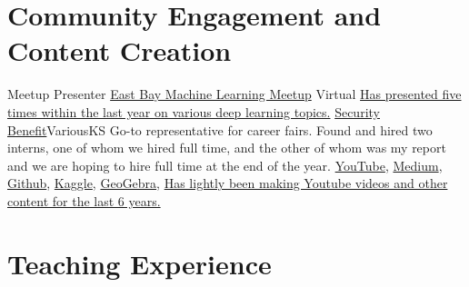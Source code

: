 \documentclass[11pt,a4paper,sans]{moderncv}
\begin{document}
\makecvtitle

\section{Community Engagement and Content Creation}
    {Meetup Presenter}
    {\href{https://www.meetup.com/east-bay-tri-valley-machine-learning-meetup/}{East Bay Machine Learning Meetup}}
    {Virtual}{}
    {\href{https://www.youtube.com/playlist?list=PLytZkHFJwKUf-P1Q_AD-hvYKyH0VREKWw}
        {Has presented five times within the last year on various deep learning topics.}}
    {\href{https://www.securitybenefit.com/splash-page}{Security Benefit}}{Various}{KS}
    {Go-to representative for career fairs.
    Found and hired two interns, one of whom we hired full time,
    and the other of whom was my report and we are hoping to hire full time at the end of the year.}
    {\href{https://www.youtube.com/@grantsmith3653/featured}{YouTube},
    \href{https://medium.com/@14.gsmith.14}{Medium},
    \href{https://github.com/GSmithApps}{Github},
    \href{https://www.kaggle.com/grannysmithapples}{Kaggle},
    \href{https://www.geogebra.org/u/gsmithapples}{GeoGebra},
    }
    {}{}{\href{https://www.youtube.com/@grantsmith3653/featured}{Has lightly been making Youtube videos and other content for the last 6 years.}}

\section{Teaching Experience}
\end{document}
